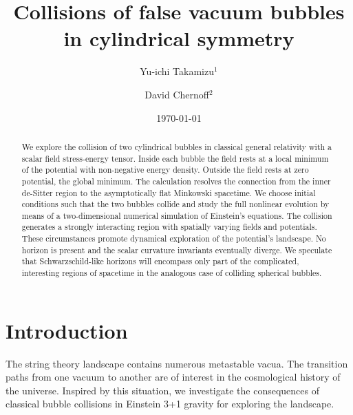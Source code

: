 \documentclass[preprintnumbers,eqsecnum,aps,prd,epsf,showpacs,nofootinbib
]{revtex4}
\begin{document}
\thispagestyle{empty}
\title{Collisions of false vacuum bubbles in cylindrical symmetry}
\author{Yu-ichi Takamizu$^{1}$}
\author{David Chernoff$^{2}$}

\date{\today}

\begin{abstract}
  We explore the collision of two cylindrical bubbles in classical
  general relativity with a scalar field stress-energy tensor. Inside
  each bubble the field rests at a local minimum of the potential with
  non-negative energy density. Outside the field rests at zero
  potential, the global minimum.  The calculation resolves the
  connection from the inner de-Sitter region to the asymptotically
  flat Minkowski spacetime. We choose initial conditions such that the
  two bubbles collide and study the full nonlinear evolution by means
  of a two-dimensional numerical simulation of Einstein's
  equations. The collision generates a strongly interacting region
  with spatially varying fields and potentials. These circumstances
  promote dynamical exploration of the potential's landscape. No
  horizon is present and the scalar curvature invariants eventually
  diverge. We speculate that Schwarzschild-like horizons will
  encompass only part of the complicated, interesting regions of
  spacetime in the analogous case of colliding spherical bubbles.
  
\end{abstract}
\maketitle
\section{Introduction}
The string theory landscape \cite{Susskind:2003kw} contains numerous
metastable vacua. The transition paths from one vacuum to another are
of interest in the cosmological history of the universe.  Inspired by
this situation, we investigate the consequences of classical bubble
collisions in Einstein 3+1 gravity for exploring the landscape.
\end{document}
